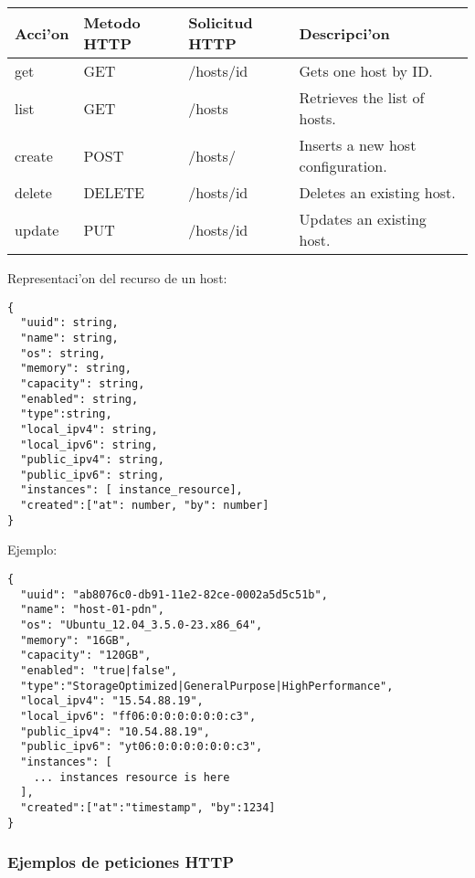 \begin{center}
 \begin{tabular}{| l | l | l | l |}
 \hline
  \rowcolor{blueapi}
  \textbf{Acci'on} & \textbf{Metodo HTTP} & \textbf{Solicitud HTTP} & \textbf{Descripci'on} \\ [0.5ex] 
  \hline\hline
  get & GET & /hosts/id & Gets one host by ID. \\
  \hline
  list & GET & /hosts & Retrieves the list of hosts. \\
  \hline  
  create & POST & /hosts/ & Inserts a new host configuration. \\
  \hline
  delete & DELETE & /hosts/id & Deletes an existing host. \\
  \hline  
  update & PUT & /hosts/id & Updates an existing host. \\ [1ex] 
  \hline
\end{tabular}
\end{center}

Representaci'on del recurso de un host:

\medskip
\begin{lstlisting}[style=json]
{
  "uuid": string,
  "name": string,
  "os": string,
  "memory": string,
  "capacity": string,
  "enabled": string,
  "type":string,
  "local_ipv4": string,
  "local_ipv6": string,
  "public_ipv4": string,
  "public_ipv6": string,
  "instances": [ instance_resource],
  "created":["at": number, "by": number]
}
\end{lstlisting}

Ejemplo:

\medskip
\begin{lstlisting}[style=json]
{
  "uuid": "ab8076c0-db91-11e2-82ce-0002a5d5c51b",
  "name": "host-01-pdn",
  "os": "Ubuntu_12.04_3.5.0-23.x86_64",
  "memory": "16GB",
  "capacity": "120GB",
  "enabled": "true|false",
  "type":"StorageOptimized|GeneralPurpose|HighPerformance",
  "local_ipv4": "15.54.88.19",
  "local_ipv6": "ff06:0:0:0:0:0:0:c3",
  "public_ipv4": "10.54.88.19",
  "public_ipv6": "yt06:0:0:0:0:0:0:c3",
  "instances": [
    ... instances resource is here
  ],
  "created":["at":"timestamp", "by":1234]
}
\end{lstlisting}

\subsubsection{Ejemplos de peticiones HTTP}

